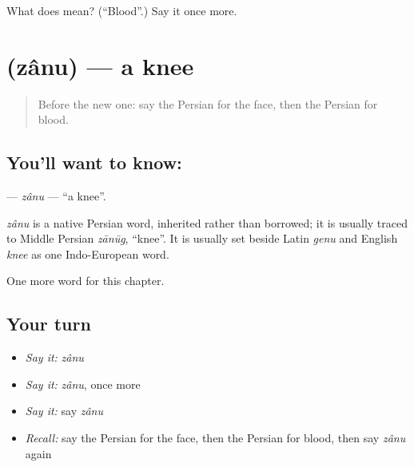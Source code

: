 \begin{tcolorbox}[breakable,colback=teal!4,colframe=teal!35!black,title={Before you move on}]
What does  mean? (\textquotedblleft{}Blood\textquotedblright{}.) Say it once more.
\end{tcolorbox}
\section[\texorpdfstring{\fa{زانو} (zânu)}{زانو (zânu)}]{ (zânu) — a knee}

\label{lesson:FA-C29-zanu}



\begin{quote}
Before the new one: say the Persian for the face, then the Persian for blood.
\end{quote}

\subsection*{You'll want to know: }
\textbf{} — \emph{zânu} — \textquotedblleft{}a knee\textquotedblright{}.

\begin{cousinweb}
\emph{zânu} is a native Persian word, inherited rather than borrowed; it is usually traced to Middle Persian \emph{zānūg}, \textquotedblleft{}knee\textquotedblright{}. It is usually set beside Latin \emph{genu} and English \emph{knee} as one Indo-European word.
\end{cousinweb}

\begin{grammarlens}[title={What you've built}]
One more word for this chapter.
\end{grammarlens}

\subsection*{Your turn}
\begin{itemize}
\raggedright
  \item \emph{Say it:} \emph{zânu}
  \item \emph{Say it:} \emph{zânu}, once more
  \item \emph{Say it:} say \emph{zânu}
  \item \emph{Recall:} say the Persian for the face, then the Persian for blood, then say \emph{zânu} again
\end{itemize}

